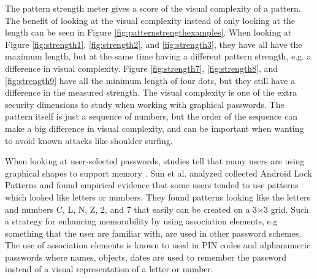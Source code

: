   The pattern strength meter gives a score of the visual complexity of a pattern. The benefit of looking at the visual complexity instead of only looking at the length can be seen in Figure \ref{fig:patternstrengthexamples}. When looking at Figure \ref{fig:strength1}, \ref{fig:strength2}, and \ref{fig:strength3}, they have all have the maximum length, but at the same time having a different pattern strength, e.g. a difference in visual complexity. Figure \ref{fig:strength7}, \ref{fig:strength8}, and \ref{fig:strength9} have all the minimum length of four dots, but they still have a difference in the measured strength. The visual complexity is one of the extra security dimensions to study when working with graphical passwords. The pattern itself is just a sequence of numbers, but the order of the sequence can make a big difference in visual complexity, and can be important when wanting to avoid known attacks like shoulder surfing. 

  When looking at user-selected passwords, studies tell that many users are using graphical shapes to support memory \cite{Weiss}. Sun et al. \cite{Sun} analyzed collected Android Lock Patterns and found empirical evidence that some users tended to use patterns which looked like letters or numbers. They found patterns looking like the letters and numbers C, L, N, Z, 2, and 7 that easily can be created on a 3$\times$3 grid. Such a strategy for enhancing memorability by using association elements, e.g something that the user are familiar with, are used in other password schemes. The use of association elements is known to used in PIN codes and alphanumeric passwords where names, objects, dates are used to remember the password instead of a visual representation of a letter or number.


